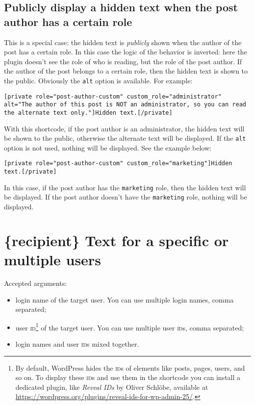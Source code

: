 \subsection{Publicly display a hidden text when the post author has a certain role}

This is a special case: the hidden text is \emph{publicly} shown when the author
of the post has a certain role. In this case the logic of the behavior is
inverted: here the plugin doesn't see the role of who is reading, but the role
of the post author. If the author of the post belongs to a certain role, then
the hidden text is shown to the public. Obviously the \verb+alt+ option is
available. For example:

\begin{lstlisting}
[private role="post-author-custom" custom_role="administrator" alt="The author of this post is NOT an administrator, so you can read the alternate text only."]Hidden text.[/private]
\end{lstlisting}

With this shortcode, if the post author is an administrator, the hidden text
will be shown to the public, otherwise the alternate text will be displayed. If
the \verb+alt+ option is not used, nothing will be displayed. See the example
below:

\begin{lstlisting}
[private role="post-author-custom" custom_role="marketing"]Hidden text.[/private]
\end{lstlisting}

In this case, if the post author has the \verb+marketing+ role, then the hidden
text will be displayed. If the post author doesn't have the \verb+marketing+
role, nothing will be displayed.

\section{\{recipient\} Text for a specific or multiple users}

Accepted arguments:

\begin{itemize}
  \item login name of the target user. You can use multiple login names, comma
  separated;
  \item user \textsc{id}\footnote{By default, WordPress hides the \textsc{id}s
  of elements like posts, pages, users, and so on. To display these \textsc{id}s
  and use them in the shortcode you can install a dedicated plugin, like
  \textit{Reveal IDs} by Oliver Schlöbe, available at
  \url{https://wordpress.org/plugins/reveal-ids-for-wp-admin-25/}.} of the
  target user. You can use multiple user \textsc{id}s, comma separated;
  \item login names and user \textsc{id}s mixed together.
\end{itemize}

